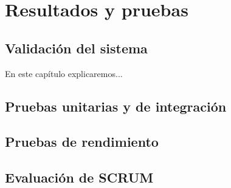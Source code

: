 \chapter{Resultados y pruebas}\label{cap:pruebas}

\section{Validación del sistema}
En este capítulo explicaremos...

\section{Pruebas unitarias y de integración}

\section{Pruebas de rendimiento}

\section{Evaluación de SCRUM}
